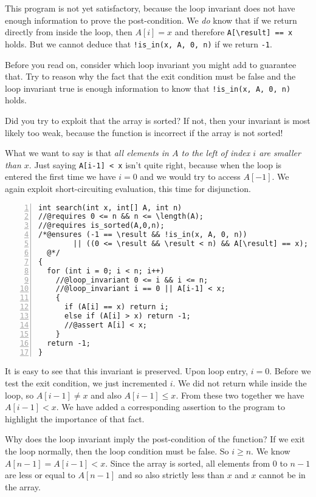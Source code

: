 This program is not yet satisfactory, because the loop
invariant does not have enough information to prove the
post-condition.  We \emph{do} know that if we return directly from
inside the loop, then $A[i] = x$ and therefore \lstinline'A[\result] == x'
holds.  But we cannot deduce that \lstinline'!is_in(x, A, 0, n)'
if we return \lstinline'-1'.

Before you read on, consider which loop invariant you might
add to guarantee that.  Try to reason why the fact that
the exit condition must be false and the loop invariant
true is enough information to know that \lstinline'!is_in(x, A, 0, n)'
holds.

\clearpage
Did you try to exploit that the array is sorted?  If not,
then your invariant is most likely too weak, because the
function is incorrect if the array is not sorted!

What we want to say is that \emph{all elements in $A$ to the left of
  index $i$ are smaller than $x$}.  Just saying \lstinline'A[i-1] < x'
isn't quite right, because when the loop is entered the first time we
have $i = 0$ and we would try to access $A[-1]$.  We again exploit
short-circuiting evaluation, this time for disjunction.
%
\begin{lstlisting}[language={[C0]C}, numbers=left]
int search(int x, int[] A, int n)
//@requires 0 <= n && n <= \length(A);
//@requires is_sorted(A,0,n);
/*@ensures (-1 == \result && !is_in(x, A, 0, n))
        || ((0 <= \result && \result < n) && A[\result] == x);
  @*/
{
  for (int i = 0; i < n; i++)
    //@loop_invariant 0 <= i && i <= n;
    //@loop_invariant i == 0 || A[i-1] < x;
    {
      if (A[i] == x) return i;
      else if (A[i] > x) return -1;
      //@assert A[i] < x;
    }
  return -1;
}
\end{lstlisting}

\noindent
It is easy to see that this invariant is preserved.  Upon loop entry,
$i = 0$.  Before we test the exit condition, we just incremented $i$.
We did not return while inside the loop, so $A[i-1] \neq x$ and
also $A[i-1] \leq x$.  From these two together we have $A[i-1] < x$.
We have added a corresponding assertion to the program to highlight
the importance of that fact.

Why does the loop invariant imply the post-condition of the function?
If we exit the loop normally, then the loop condition must be false.
So $i \geq n$.  We know $A[n-1] = A[i-1] < x$.  Since the array is
sorted, all elements from $0$ to $n-1$ are less or equal to $A[n-1]$
and so also strictly less than $x$ and $x$ cannot be in the array.

